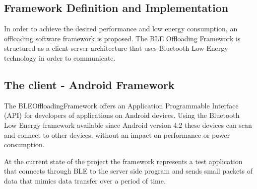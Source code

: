 \documentclass[twoside]{article}
\begin{document}
\begin{multicols}{2}
\section{Framework Definition and Implementation}
\label{implementation}

In order to achieve the desired performance and low energy consumption, an offloading software framework is proposed. The BLE Offloading Framework is structured as a client-server architecture that uses Bluetooth Low Energy technology in order to communicate.

\subsection{The client - Android Framework}

The BLEOffloadingFramework offers an Application Programmable Interface (API) for developers of applications on Android devices. Using the Bluetooth Low Energy framework available since Android version 4.2 these devices can scan and connect to other devices, without an impact on performance or power consumption.

At the current state of the project the framework represents a test application that connects through BLE to the server side program and sends small packets of data that mimics data transfer over a period of time.




\end{multicols}
\end{document}
